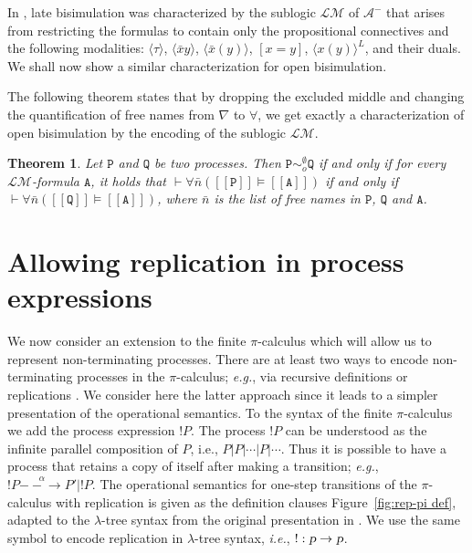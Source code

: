 \documentclass{acmtrans2m}
\newtheorem{theorem}{Theorem}
\def\Ascr{{\mathcal A}}
\def\Lscr{{\mathcal L}}
\def\Mscr{{\mathcal M}}
\def\Api{{\mathtt A}}
\def\Ppi{{\mathtt P}}
\def\Qpi{{\mathtt Q}}
\newcommand{\one  }[3]{#1\stackrel{#2}{-\!\!-\!\!\!\rightarrow    } #3}
\newcommand{\proc}{\hbox{\sl p}}
\newcommand{\ra}{\rightarrow}
\newcommand{\trans}[1]{[\![ #1 ]\!]}
\begin{document}
In \cite{milner93tcs}, late bisimulation was characterized by the
sublogic $\Lscr\Mscr$ of $\Ascr^-$ that arises from restricting the
formulas to contain only the propositional connectives and the
following modalities: $\langle \tau \rangle$, $\langle \bar x y
\rangle$, $\langle \bar x(y) \rangle$, $[x = y]$, $\langle
x(y)\rangle^L$, and their duals.  We shall now show a similar 
characterization for open bisimulation.

The following theorem states that by dropping the excluded middle and
changing the quantification of free names from $\nabla$ to $\forall$,
we get exactly a characterization of open bisimulation by the encoding
of the sublogic $\Lscr\Mscr$.

\begin{theorem}
\label{thm:ch-open}
Let $\Ppi$ and $\Qpi$ be two processes.
Then $\Ppi \sim_o^{\emptyset} \Qpi$ if and only if
for every $\Lscr \Mscr$-formula $\Api$,
it holds that $\vdash \forall \bar n(\trans{\Ppi} \models \trans{\Api})$
if and only if 
$\vdash \forall \bar n(\trans{\Qpi} \models \trans{\Api})$,
where $\bar n$ is the list of free names in $\Ppi$, $\Qpi$ and $\Api$.
\end{theorem}


\section{Allowing replication in process expressions}
\label{sec:pi rep}


We now consider an extension to the finite $\pi$-calculus which will allow
us to represent non-terminating processes. 
There are at least two ways to encode non-terminating processes in the
$\pi$-calculus; {\em e.g.}, via recursive definitions or
replications \cite{sangiorgi01}. We consider here the latter approach since it leads to
a simpler presentation of the operational semantics. 
To the syntax of the finite $\pi$-calculus we add the process expression
$!P$. The process $!P$ can be understood as the infinite
parallel composition of $P$, i.e., $P | P | \cdots | P | \cdots$.
Thus it is possible to have a process 
that retains a copy of itself after making a transition;
{\em e.g.}, $\one{!P}{\alpha}{P' | !P}$. The operational semantics for one-step
transitions of the $\pi$-calculus with replication 
is given as the definition clauses Figure~\ref{fig:rep-pi def}, 
adapted to the $\lambda$-tree syntax from the original presentation in \cite{sangiorgi01}. 
We use the same symbol to encode replication in $\lambda$-tree syntax,
{\em i.e.}, $! : \proc \ra \proc$.
\end{document}
